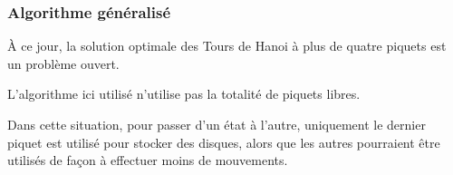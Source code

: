 \documentclass{beamer}%
\begin{document}
			\begin{frame}
				\frametitle{Algorithme généralisé}
				À ce jour, la solution optimale des Tours de Hanoi à plus de quatre
				piquets est un problème ouvert.
				
				L'algorithme ici utilisé n'utilise pas la totalité de piquets libres.
				
				\begin{figure}
					\centering
					\setcounter{subfigure}{0}
					\qquad
				\end{figure}
				
				Dans cette situation, pour passer d'un état à l'autre, uniquement le dernier
				piquet est utilisé pour stocker des disques, alors que les autres pourraient
				être utilisés de façon à effectuer moins de mouvements.
			\end{frame}
			
\end{document}
